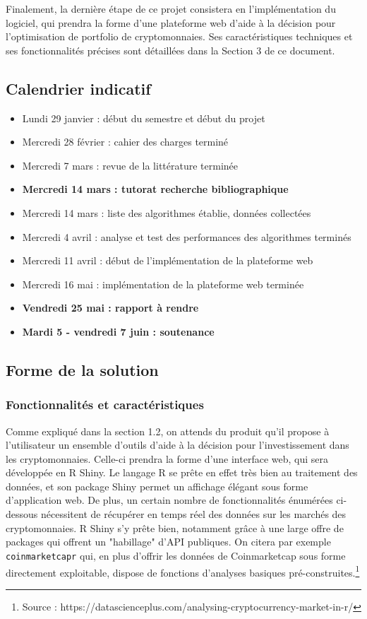 \documentclass[a4paper]{article}
\begin{document}
Finalement, la dernière étape de ce projet consistera en l'implémentation du logiciel, qui prendra la forme d’une plateforme web d’aide à la décision pour l’optimisation de portfolio de cryptomonnaies. Ses caractéristiques techniques et ses fonctionnalités précises sont détaillées dans la Section 3 de ce document.

\subsection{Calendrier indicatif}

\begin{itemize}
    \item Lundi 29 janvier : début du semestre et début du projet
    \item Mercredi 28 février : cahier des charges terminé
    \item Mercredi 7 mars : revue de la littérature terminée
    \item \textbf{Mercredi 14 mars : tutorat recherche bibliographique}
    \item Mercredi 14 mars : liste des algorithmes établie, données collectées
    \item Mercredi 4 avril : analyse et test des performances des algorithmes terminés
    \item Mercredi 11 avril : début de l'implémentation de la plateforme web
    \item Mercredi 16 mai : implémentation de la plateforme web terminée
    \item \textbf{Vendredi 25 mai : rapport à rendre}
    \item \textbf{Mardi 5 - vendredi 7 juin : soutenance}
\end{itemize}

\subsection{Forme de la solution}

\subsubsection{Fonctionnalités et caractéristiques}

Comme expliqué dans la section 1.2, on attends du produit qu'il propose à l'utilisateur un ensemble d'outils d'aide à la décision pour l'investissement dans les cryptomonnaies. Celle-ci prendra la forme d'une interface web, qui sera développée en R Shiny. Le langage R se prête en effet très bien au traitement des données, et son package Shiny permet un affichage élégant sous forme d'application web. De plus, un certain nombre de fonctionnalités énumérées ci-dessous nécessitent de récupérer en temps réel des données sur les marchés des cryptomonnaies. R Shiny s'y prête bien, notamment grâce à une large offre de packages qui offrent un "habillage" d'API publiques. On citera par exemple \texttt{coinmarketcapr} qui, en plus d'offrir les données de Coinmarketcap sous forme directement exploitable, dispose de fonctions d'analyses basiques pré-construites.\footnote{Source : https://datascienceplus.com/analysing-cryptocurrency-market-in-r/} 
\end{document}
